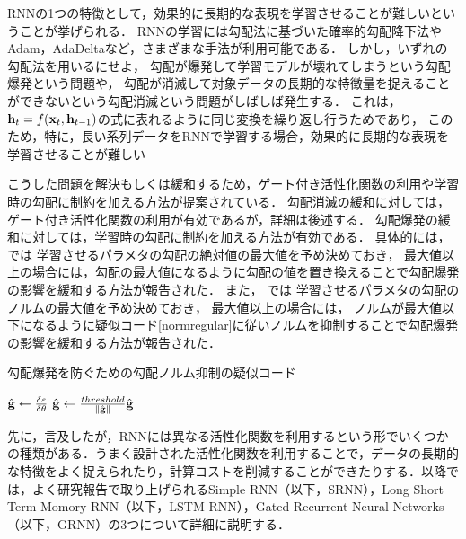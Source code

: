 RNNの1つの特徴として，効果的に長期的な表現を学習させることが難しいということが挙げられる\cite{bengio1994learning}．
RNNの学習には勾配法に基づいた確率的勾配降下法\cite{robbins1951stochastic,kushner2003stochastic}やAdam\cite{kingma2014adam}，AdaDelta\cite{zeiler2012adadelta}など，さまざまな手法が利用可能である．
しかし，いずれの勾配法を用いるにせよ，
勾配が爆発して学習モデルが壊れてしまうという勾配爆発\cite{bengio1994learning,pascanu2013difficulty}という問題や，
勾配が消滅して対象データの長期的な特徴量を捉えることができないという勾配消滅\cite{pascanu2013difficulty, hochreiter1998vanishing}という問題がしばしば発生する．
これは，
${\bf h}_t = f({\bf x}_t, {\bf h}_{t-1})$の式に表れるように同じ変換を繰り返し行うためであり，
このため，特に，長い系列データをRNNで学習する場合，効果的に長期的な表現を学習させることが難しい


こうした問題を解決もしくは緩和するため，ゲート付き活性化関数の利用や学習時の勾配に制約を加える方法が提案されている．
勾配消滅の緩和に対しては，ゲート付き活性化関数の利用が有効であるが，詳細は後述する．
勾配爆発の緩和に対しては，学習時の勾配に制約を加える方法が有効である．
具体的には，
\cite{mikolov2012statistical}では
学習させるパラメタの勾配の絶対値の最大値を予め決めておき，
最大値以上の場合には，勾配の最大値になるように勾配の値を置き換えることで勾配爆発の影響を緩和する方法が報告された．
また，
\cite{pascanu2013difficulty}では
学習させるパラメタの勾配のノルムの最大値を予め決めておき，
最大値以上の場合には， ノルムが最大値以下になるように疑似コード\ref{normregular}に従いノルムを抑制することで勾配爆発の影響を緩和する方法が報告された．
\begin{algorithm}                      
\caption{勾配爆発を防ぐための勾配ノルム抑制の疑似コード}
\label{normregular}                          
\begin{algorithmic}                  
	\STATE $\hat{{\bf g}} \leftarrow \frac{\delta \varepsilon}{\delta {\bf \theta}}$
	\STATE $\hat{{\bf g}} \leftarrow \frac{threshold}{\Vert \hat{{\bf g}} \Vert} \hat{{\bf g}}$
	\ENDIF
\end{algorithmic}
\end{algorithm}


先に，言及したが，RNNには異なる活性化関数を利用するという形でいくつかの種類がある．うまく設計された活性化関数を利用することで，データの長期的な特徴をよく捉えられたり，計算コストを削減することができたりする．以降では，よく研究報告で取り上げられるSimple RNN（以下，SRNN）\cite{williams1989learning}，Long Short  Term Momory RNN（以下，LSTM-RNN）\cite{hochreiter1997long}，Gated Recurrent Neural Networks（以下，GRNN）\cite{cho2014learning}の3つについて詳細に説明する．

